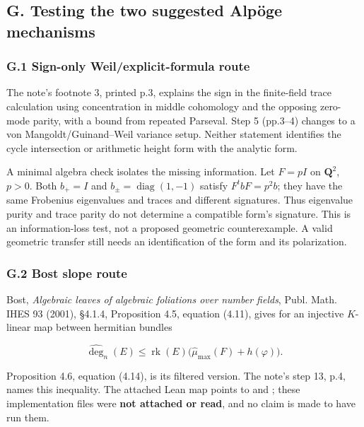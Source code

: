 \documentclass[11pt,a4paper]{article}
\begin{document}
\subsection{G. Testing the two suggested Alpöge
mechanisms}\label{g.-testing-the-two-suggested-alpuxf6ge-mechanisms}

\subsubsection{G.1 Sign-only Weil/explicit-formula
route}\label{g.1-sign-only-weilexplicit-formula-route}

The note's footnote 3, printed p.3, explains the sign in the
finite-field trace calculation using concentration in middle cohomology
and the opposing zero-mode parity, with a bound from repeated Parseval.
Step 5 (pp.3--4) changes to a von Mangoldt/Guinand--Weil variance setup.
Neither statement identifies the cycle intersection or arithmetic height
form with the analytic form.

A minimal algebra check isolates the missing information. Let \(F=pI\)
on \(\mathbf Q^2\), \(p>0\). Both \(b_+=I\) and
\(b_\pm=\operatorname{diag}(1,-1)\) satisfy \(F^tbF=p^2b\); they have
the same Frobenius eigenvalues and traces and different signatures. Thus
eigenvalue purity and trace parity do not determine a compatible form's
signature. This is an information-loss test, not a proposed geometric
counterexample. A valid geometric transfer still needs an identification
of the form and its polarization.

\subsubsection{G.2 Bost slope route}\label{g.2-bost-slope-route}

Bost, \emph{Algebraic leaves of algebraic foliations over number
fields}, Publ. Math. IHES 93 (2001), §4.1.4, Proposition 4.5, equation
(4.11), gives for an injective \(K\)-linear map between hermitian
bundles

\[
\widehat{\deg}_{n}(E)
\le\operatorname{rk}(E)\bigl(\widehat\mu_{\max}(F)+h(\varphi)\bigr).
\tag{AR.7}
\]

Proposition 4.6, equation (4.14), is its filtered version. The note's
step 13, p.4, names this inequality. The attached Lean map points to
and ; these
implementation files were \textbf{not attached or read}, and no claim is
made to have run them.
\end{document}
